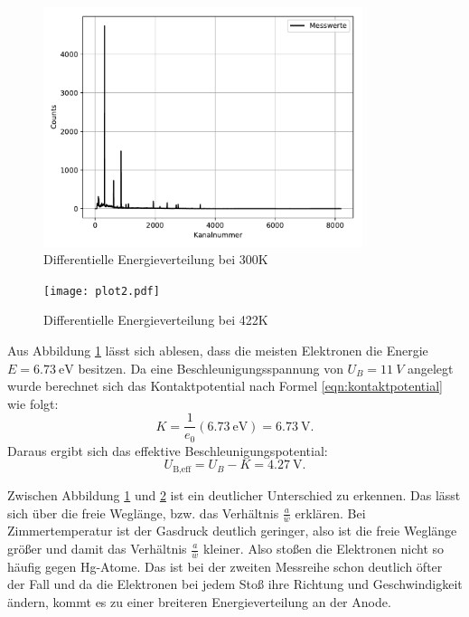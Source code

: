 \begin{figure}[H]
  \centering
  \includegraphics[height=7cm]{plot1.pdf}
  \caption{Differentielle Energieverteilung bei 300\;K }
  \label{fig:plot1}
\end{figure}

 \begin{figure}[H]
   \centering
   \texttt{[image: plot2.pdf]}
   \caption{Differentielle Energieverteilung bei 422\;K}
   \label{fig:plot2}
 \end{figure}

Aus Abbildung \ref{fig:plot1} lässt sich ablesen, dass die meisten Elektronen
die Energie $E=\SI{6,73}{\eV}$ besitzen.
Da eine Beschleunigungsspannung von $U_B=\SI{11}{V}$ angelegt wurde berechnet sich das
Kontaktpotential nach Formel \ref{eqn:kontaktpotential} wie folgt:
\begin{equation}
  K=\frac{1}{e_0}(\SI{6,73}{\eV})=\SI{6,73}{\V}.
  \label{kontakt}
\end{equation}
Daraus ergibt sich das effektive Beschleunigungspotential:
\begin{equation}
  U_{\text{B,eff}}= U_B -K =\SI{4,27}{\V}.
\end{equation}

Zwischen Abbildung \ref{fig:plot1} und \ref{fig:plot2} ist ein deutlicher
Unterschied zu erkennen. Das lässt sich über die freie Weglänge, bzw. das Verhältnis
$\frac{a}{\bar{w}}$ erklären. Bei Zimmertemperatur ist der Gasdruck deutlich geringer,
also ist die freie Weglänge größer und damit das Verhältnis $\frac{a}{\bar{w}}$
kleiner. Also stoßen die Elektronen nicht so häufig gegen Hg-Atome. Das ist bei der zweiten
Messreihe schon deutlich öfter der Fall und da die Elektronen bei jedem Stoß ihre
Richtung und Geschwindigkeit ändern, kommt es zu einer breiteren Energieverteilung
an der Anode.

